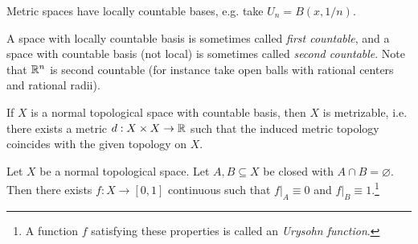 \begin{remark}
  Metric spaces have locally countable bases, e.g.
  take $U_n = B(x, 1 / n)$.
\end{remark}

\begin{remark}
  A space with locally countable basis is
  sometimes called \emph{first countable}, and a space
  with countable basis (not local) is sometimes
  called \emph{second countable}. Note that
  $\mathbb{R}^n$ is second countable (for instance
  take open balls with rational centers and
  rational radii).
\end{remark}

\begin{theorem}
  If $X$ is a normal topological space with
  countable basis, then $X$ is metrizable,
  i.e. there exists a metric $d : X \times X \to \mathbb{R}$
  such that the induced metric topology coincides
  with the given topology on $X$.
\end{theorem}

\begin{lemma}
  Let $X$ be a normal topological space. Let
  $A, B \subseteq X$ be closed with $A \cap B = \varnothing$.
  Then there exists $f : X \to [0, 1]$ continuous
  such that $f|_A \equiv 0$ and $f|_B \equiv 1$.\footnote{A function $f$ satisfying these properties is called an \emph{Urysohn function}.}
\end{lemma}

